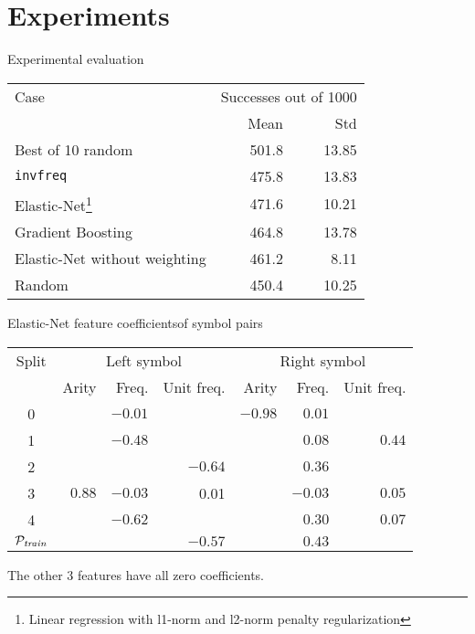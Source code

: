 \documentclass[notes]{beamer}
\begin{document}
\section{Experiments}

\begin{frame}{Experimental evaluation}
\begin{table}
\begin{tabular}{l|rr}
	Case & \multicolumn{2}{c}{Successes out of 1000} \\
	& Mean & Std \\
	\hline
	Best of 10 random & 501.8 & 13.85 \\
	\texttt{invfreq} & 475.8 & 13.83 \\
	Elastic-Net\footnote{Linear regression with l1-norm and l2-norm penalty regularization} & 471.6 & 10.21 \\
	Gradient Boosting & 464.8 & 13.78 \\
	Elastic-Net without weighting & 461.2 & 8.11 \\
	Random & 450.4 & 10.25 \\
\end{tabular}
\end{table}
\end{frame}

\begin{frame}{Elastic-Net feature coefficients}{of symbol pairs}
\begin{table}
\begin{tabular}{c|rrr|rrr}
	Split & \multicolumn{3}{c}{Left symbol} & \multicolumn{3}{c}{Right symbol} \\
	& Arity & Freq. & Unit freq. & Arity & Freq. & Unit freq. \\
	\hline
	0 &     &$-0.01$&     &$-0.98$&$ 0.01$&      \\
	1 &     &$-0.48$&     &     &$ 0.08$&$ 0.44 $\\
	2 &     &     &$-0.64$&     &$ 0.36$&      \\
	3 &$ 0.88$&$-0.03$& 0.01&     &$-0.03$&$ 0.05 $\\
	4 &     &$-0.62$&     &     &$ 0.30$&$ 0.07 $\\
	\hline
	\(\mathcal{P}_{\mathit{train}}\) &     &     &$-0.57$&     &$ 0.43$&      \\
\end{tabular}
\end{table}

The other 3 features have all zero coefficients.
\end{frame}
\end{document}
